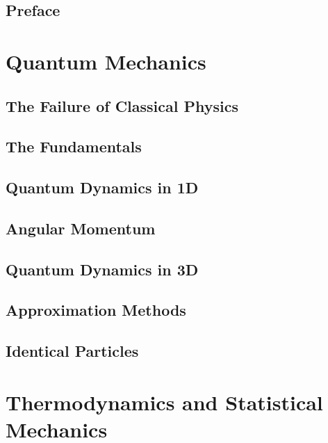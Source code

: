 \documentclass[a4paper, 11pt]{book}
\begin{document}


\chapter*{Preface}
	
\tableofcontents
{}
\part{Quantum Mechanics}
	\chapter{The Failure of Classical Physics}
		
	\chapter{The Fundamentals}
		
	\chapter{Quantum Dynamics in 1D}
		
		\chapter{Angular Momentum}
		
	\chapter{Quantum Dynamics in 3D}
		
	\chapter{Approximation Methods}
		
	\chapter{Identical Particles}
		
\part{Thermodynamics and Statistical Mechanics}
		
		
		
		
\end{document}
